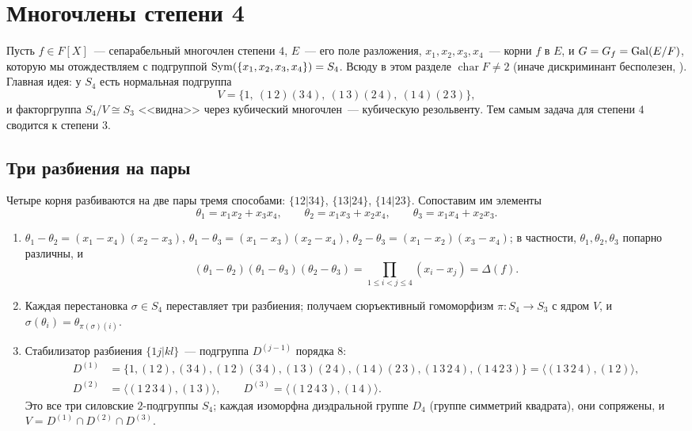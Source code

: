 \makeatletter
{}
\makeatother
\section{Многочлены степени 4}

Пусть $f\in F[X]$~--- сепарабельный многочлен степени $4$, $E$~--- его поле разложения, $x_1,x_2,x_3,x_4$~--- корни $f$ в $E$, и
$G=G_f=\operatorname{Gal}(E/F)$, которую мы отождествляем с подгруппой $\operatorname{Sym}(\{x_1,x_2,x_3,x_4\})=S_4$. Всюду в этом разделе
$\operatorname{char}F\ne2$ (иначе дискриминант бесполезен, ). Главная идея: у $S_4$ есть нормальная подгруппа
\[
V=\{1,\ (1\,2)(3\,4),\ (1\,3)(2\,4),\ (1\,4)(2\,3)\},
\]
и факторгруппа $S_4/V\cong S_3$ <<видна>> через кубический многочлен~--- кубическую резольвенту. Тем самым задача для степени
$4$ сводится к степени $3$.

\subsection*{Три разбиения на пары}

Четыре корня разбиваются на две пары тремя способами: $\{12|34\}$, $\{13|24\}$, $\{14|23\}$. Сопоставим им элементы
\[
\theta_1=x_1x_2+x_3x_4,\qquad \theta_2=x_1x_3+x_2x_4,\qquad \theta_3=x_1x_4+x_2x_3 .
\]

\begin{proposition}[4.7j]
\begin{enumerate}[label=\textup{(\alph*)}]
\item $\theta_1-\theta_2=(x_1-x_4)(x_2-x_3)$, $\theta_1-\theta_3=(x_1-x_3)(x_2-x_4)$, $\theta_2-\theta_3=(x_1-x_2)(x_3-x_4)$; в частности,
$\theta_1,\theta_2,\theta_3$ попарно различны, и
\[
(\theta_1-\theta_2)(\theta_1-\theta_3)(\theta_2-\theta_3)=\prod_{1\le i<j\le4}(x_i-x_j)=\Delta(f).
\]
\item Каждая перестановка $\sigma\in S_4$ переставляет три разбиения; получаем сюръективный гомоморфизм $\pi\colon S_4\to S_3$
с ядром $V$, и $\sigma(\theta_i)=\theta_{\pi(\sigma)(i)}$.
\item Стабилизатор разбиения $\{1j|kl\}$~--- подгруппа $D^{(j-1)}$ порядка $8$:
\begin{align*}
D^{(1)}&=\{1,(1\,2),(3\,4),(1\,2)(3\,4),(1\,3)(2\,4),(1\,4)(2\,3),(1\,3\,2\,4),(1\,4\,2\,3)\}=\langle(1\,3\,2\,4),(1\,2)\rangle,\\
D^{(2)}&=\langle(1\,2\,3\,4),(1\,3)\rangle,\qquad D^{(3)}=\langle(1\,2\,4\,3),(1\,4)\rangle .
\end{align*}
Это все три силовские $2$-подгруппы $S_4$; каждая изоморфна диэдральной группе $D_4$ (группе симметрий квадрата), они
сопряжены, и $V=D^{(1)}\cap D^{(2)}\cap D^{(3)}$.
\end{enumerate}
\end{proposition}

